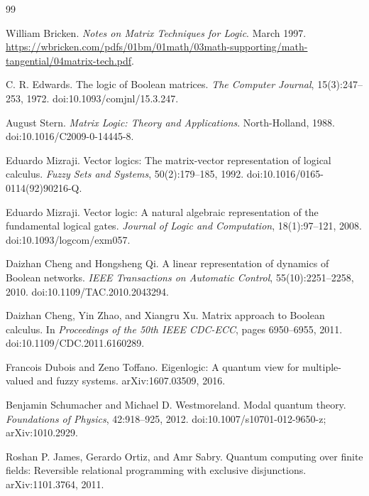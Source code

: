 \documentclass[11pt]{article}
\theoremstyle{definition}
\begin{document}
\begin{thebibliography}{99}

William Bricken.
\newblock \emph{Notes on Matrix Techniques for Logic}.
\newblock March 1997.
\newblock \url{https://wbricken.com/pdfs/01bm/01math/03math-supporting/math-tangential/04matrix-tech.pdf}.

C. R. Edwards.
\newblock The logic of Boolean matrices.
\newblock \emph{The Computer Journal}, 15(3):247--253, 1972.
\newblock doi:10.1093/comjnl/15.3.247.

August Stern.
\newblock \emph{Matrix Logic: Theory and Applications}.
\newblock North-Holland, 1988.
\newblock doi:10.1016/C2009-0-14445-8.

Eduardo Mizraji.
\newblock Vector logics: The matrix-vector representation of logical calculus.
\newblock \emph{Fuzzy Sets and Systems}, 50(2):179--185, 1992.
\newblock doi:10.1016/0165-0114(92)90216-Q.

Eduardo Mizraji.
\newblock Vector logic: A natural algebraic representation of the fundamental logical gates.
\newblock \emph{Journal of Logic and Computation}, 18(1):97--121, 2008.
\newblock doi:10.1093/logcom/exm057.

Daizhan Cheng and Hongsheng Qi.
\newblock A linear representation of dynamics of Boolean networks.
\newblock \emph{IEEE Transactions on Automatic Control}, 55(10):2251--2258, 2010.
\newblock doi:10.1109/TAC.2010.2043294.

Daizhan Cheng, Yin Zhao, and Xiangru Xu.
\newblock Matrix approach to Boolean calculus.
\newblock In \emph{Proceedings of the 50th IEEE CDC-ECC}, pages 6950--6955, 2011.
\newblock doi:10.1109/CDC.2011.6160289.

Francois Dubois and Zeno Toffano.
\newblock Eigenlogic: A quantum view for multiple-valued and fuzzy systems.
\newblock arXiv:1607.03509, 2016.

Benjamin Schumacher and Michael D. Westmoreland.
\newblock Modal quantum theory.
\newblock \emph{Foundations of Physics}, 42:918--925, 2012.
\newblock doi:10.1007/s10701-012-9650-z; arXiv:1010.2929.

Roshan P. James, Gerardo Ortiz, and Amr Sabry.
\newblock Quantum computing over finite fields: Reversible relational programming with exclusive disjunctions.
\newblock arXiv:1101.3764, 2011.


\end{thebibliography}
\end{document}
